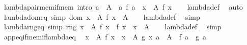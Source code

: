 \begin{isabellebody}
\isanewline
{}\isamarkupfalse%
\ lambda{\isacharunderscore}{\kern0pt}pair{\isacharunderscore}{\kern0pt}mem{\isacharunderscore}{\kern0pt}if{\isacharunderscore}{\kern0pt}mem\ {\isacharbrackleft}{\kern0pt}intro{\isacharbrackright}{\kern0pt}{\isacharcolon}{\kern0pt}\ {\isachardoublequoteopen}a\ {\isasymin}\ A\ {\isasymLongrightarrow}\ {\isasymlangle}a{\isacharcomma}{\kern0pt}\ f\ a{\isasymrangle}\ {\isasymin}\ {\isasymlambda}x\ {\isasymin}\ A{\isachardot}{\kern0pt}\ f\ x{\isachardoublequoteclose}\isanewline
%
\isadelimproof
\ \ %
\endisadelimproof
%
\isatagproof
{}\isamarkupfalse%
\ lambda{\isacharunderscore}{\kern0pt}def\ \isamarkupfalse%
\ auto%
\endisatagproof
{\isafoldproof}%
%
\isadelimproof
\isanewline
%
\endisadelimproof
\isanewline
{}\isamarkupfalse%
\ lambda{\isacharunderscore}{\kern0pt}dom{\isacharunderscore}{\kern0pt}eq\ {\isacharbrackleft}{\kern0pt}simp{\isacharbrackright}{\kern0pt}{\isacharcolon}{\kern0pt}\ {\isachardoublequoteopen}dom\ {\isacharparenleft}{\kern0pt}{\isasymlambda}x\ {\isasymin}\ A{\isachardot}{\kern0pt}\ f\ x{\isacharparenright}{\kern0pt}\ {\isacharequal}{\kern0pt}\ A{\isachardoublequoteclose}\isanewline
%
\isadelimproof
\ \ %
\endisadelimproof
%
\isatagproof
{}\isamarkupfalse%
\ lambda{\isacharunderscore}{\kern0pt}def\ \isamarkupfalse%
\ simp%
\endisatagproof
{\isafoldproof}%
%
\isadelimproof
\isanewline
%
\endisadelimproof
\isanewline
{}\isamarkupfalse%
\ lambda{\isacharunderscore}{\kern0pt}rng{\isacharunderscore}{\kern0pt}eq\ {\isacharbrackleft}{\kern0pt}simp{\isacharbrackright}{\kern0pt}{\isacharcolon}{\kern0pt}\ {\isachardoublequoteopen}rng\ {\isacharparenleft}{\kern0pt}{\isasymlambda}x\ {\isasymin}\ A{\isachardot}{\kern0pt}\ f\ x{\isacharparenright}{\kern0pt}\ {\isacharequal}{\kern0pt}\ {\isacharbraceleft}{\kern0pt}f\ x\ {\isacharbar}{\kern0pt}\ x\ {\isasymin}\ A{\isacharbraceright}{\kern0pt}{\isachardoublequoteclose}\isanewline
%
\isadelimproof
\ \ %
\endisadelimproof
%
\isatagproof
{}\isamarkupfalse%
\ lambda{\isacharunderscore}{\kern0pt}def\ \isamarkupfalse%
\ simp%
\endisatagproof
{\isafoldproof}%
%
\isadelimproof
\isanewline
%
\endisadelimproof
\isanewline
{}\isamarkupfalse%
\ app{\isacharunderscore}{\kern0pt}eq{\isacharunderscore}{\kern0pt}if{\isacharunderscore}{\kern0pt}mem{\isacharunderscore}{\kern0pt}if{\isacharunderscore}{\kern0pt}lambda{\isacharunderscore}{\kern0pt}eq{\isacharcolon}{\kern0pt}\isanewline
\ \ {\isachardoublequoteopen}{\isasymlbrakk}{\isacharparenleft}{\kern0pt}{\isasymlambda}x\ {\isasymin}\ A{\isachardot}{\kern0pt}\ f\ x{\isacharparenright}{\kern0pt}\ {\isacharequal}{\kern0pt}\ {\isasymlambda}x\ {\isasymin}\ A{\isachardot}{\kern0pt}\ g\ x{\isacharsemicolon}{\kern0pt}\ a\ {\isasymin}\ A{\isasymrbrakk}\ {\isasymLongrightarrow}\ f\ a\ {\isacharequal}{\kern0pt}\ g\ a{\isachardoublequoteclose}\isanewline

\end{isabellebody}
